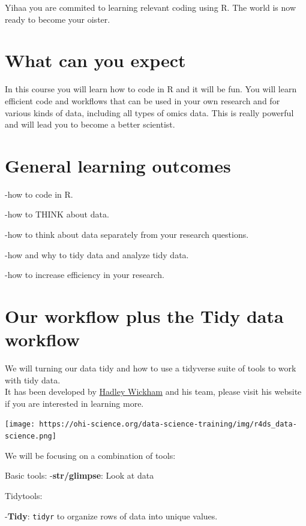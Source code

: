 \documentclass[
]{book}
\begin{document}
Yihaa you are commited to learning relevant coding using R. The world is
now ready to become your oister.

\hypertarget{what-can-you-expect}{%
\section{What can you expect}\label{what-can-you-expect}}

In this course you will learn how to code in R and it will be fun. You
will learn efficient code and workflows that can be used in your own
research and for various kinds of data, including all types of omics
data. This is really powerful and will lead you to become a better
scientist.

\hypertarget{general-learning-outcomes}{%
\section{General learning outcomes}\label{general-learning-outcomes}}

-how to code in R.

-how to THINK about data.

-how to think about data separately from your research questions.

-how and why to tidy data and analyze tidy data.

-how to increase efficiency in your research.

\hypertarget{our-workflow-plus-the-tidy-data-workflow}{%
\section{Our workflow plus the Tidy data
workflow}\label{our-workflow-plus-the-tidy-data-workflow}}

We will turning our data tidy and how to use a tidyverse suite of tools
to work with tidy data.\\
It has been developed by \href{https://hadley.nz/}{Hadley Wickham} and
his team, please visit his website if you are interested in learning
more.

\texttt{[image: https://ohi-science.org/data-science-training/img/r4ds\_data-science.png]}

We will be focusing on a combination of tools:

Basic tools: -\textbf{str/glimpse}: Look at data

Tidytools:

-\textbf{Tidy}: \texttt{tidyr} to organize rows of data into unique
values.
\end{document}
